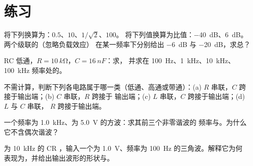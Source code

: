 \section{练习}

\begin{exercise}[$\star$]\label{exo:b1:filters-transfer-functions:1}
将下列换算为：$0.5$、$10$、$1/\sqrt2$、$100$。
将下列值换算为比值：\qty{-40}{dB}、\qty{+6}{dB}。两个级联的（忽略负载效应）
在某一频率下分别给出 \qty{-6}{dB} 与 \qty{-20}{dB}，求总？
\end{exercise}

\begin{exercise}[$\star$]\label{exo:b1:filters-transfer-functions:2}
RC 低通，$R = \qty{10}{k\ohm}$，$C = \qty{16}{nF}$：求，
并求在 \qty{100}{Hz}、\qty{1}{kHz}、\qty{10}{kHz}、
\qty{100}{kHz} 频率处的。
\end{exercise}

\begin{exercise}[$\star$]\label{exo:b1:filters-transfer-functions:3}
不需计算，判断下列各电路属于哪一类（低通、高通或带通）：(a)
$R$ 串联，$C$ 跨接于输出端；(b) $C$ 串联，$R$ 跨接于
输出端；(c) $L$ 串联，$C$ 跨接于输出端；(d) $L$ 与 $C$ 串联，
$R$ 跨接于输出端。
\end{exercise}

\begin{exercise}[$\star$]\label{exo:b1:filters-transfer-functions:4}
一个频率为 \qty{1.0}{kHz}、为 \qty{5.0}{V} 的方波：求其前三个非零谐波的
频率与。为什么
它不含偶次谐波？
\end{exercise}

\begin{exercise}[$\star\star$]\label{exo:b1:filters-transfer-functions:5}
为 \qty{10}{kHz} 的 CR ，输入一个为
\qty{1.0}{V}、频率为 \qty{100}{Hz} 的三角波。解释它为何
表现为，并给出输出波形的形状与。
\end{exercise}

